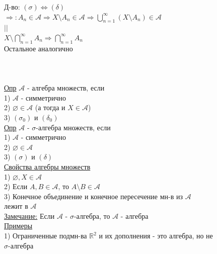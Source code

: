 \documentclass{article}
\begin{document}
Д-во: $(\sigma) \Leftrightarrow (\delta)$ \\
\hspace*{1cm} $\Rightarrow: A_n \in \mathcal{A} \Rightarrow X \setminus A_n \in \mathcal{A} \Rightarrow \bigcup_{n=1}^{\infty} (X \setminus A_n) \in \mathcal{A}$ \\
\hspace*{7.2cm} $||$ \\
\hspace*{6.5cm} $X \setminus \bigcap_{n=1}^{\infty} A_n \Rightarrow \bigcap_{n=1}^{\infty} A_n$
\\ Остальное аналогично
\\
\\
\\
\\
\underline{Опр} $\mathcal{A}$ - алгебра множеств, если \\
\hspace*{1cm} 1) $\mathcal{A}$ - симметрично \\
\hspace*{1cm} 2) $\varnothing \in \mathcal{A}$ (а тогда и $X \in \mathcal{A}$) \\
\hspace*{1cm} 3) $(\sigma_0)$ и $(\delta_0)$ \\
\underline{Опр} $\mathcal{A}$ - $\sigma$-алгебра множеств, если \\
\hspace*{1cm} 1) $\mathcal{A}$ - симметрично \\
\hspace*{1cm} 2) $\varnothing \in \mathcal{A}$ \\
\hspace*{1cm} 3) $(\sigma)$ и $(\delta)$ \\
\underline{Свойства алгебры множеств} \\
1) $\varnothing, X \in \mathcal{A}$ \\
2) Если $A, B \in \mathcal{A}$, то $A \setminus B \in \mathcal{A}$ \\
3) Конечное объединение и конечное пересечение мн-в из $\mathcal{A}$ \\
лежит в $\mathcal{A}$ \\
\underline{Замечание:} Если $\mathcal{A}$ - $\sigma$-алгебра, то $\mathcal{A}$ - алгебра \\
\underline{Примеры} \\
1) Ограниченные подмн-ва $\mathbb{R}^2$ и их дополнения - это алгебра, но не \\
$\sigma$-алгебра \\
\end{document}
